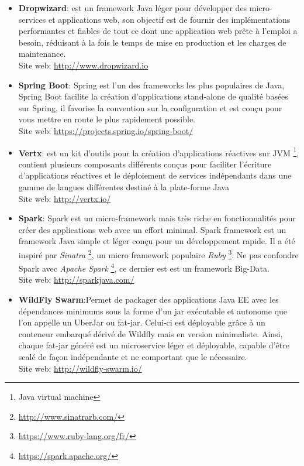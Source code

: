 \documentclass[12pt, a4paper, openany]{report}
\begin{document}
   \begin{itemize}
      \item \textbf{Dropwizard}: est un framework Java léger pour développer des micro-services et applications web, son objectif est de fournir des implémentations performantes et fiables de tout ce dont une application web prête à l'emploi a besoin, réduisant à la fois le temps de mise en production et les charges de maintenance.\\
      Site web: \url{http://www.dropwizard.io}
      
      \item \textbf{Spring Boot}: Spring est l'un des frameworks les plus populaires de Java, Spring Boot facilite la création d'applications stand-alone de qualité basées sur Spring, il favorise la convention sur la configuration et est conçu pour vous mettre en route le plus rapidement possible.\\
      Site web: \url{https://projects.spring.io/spring-boot/}
      
      \item \textbf{Vertx}: est un kit d'outils pour la création d'applications réactives sur JVM \footnote{Java virtual machine}, contient plusieurs composants différents conçus pour faciliter l'écriture d'applications réactives et le déploiement de services indépendants dans une gamme de langues différentes destiné à la plate-forme Java \\
      Site web: \url{http://vertx.io/}
      
      \item \textbf{Spark}: Spark est un micro-framework mais très riche en fonctionnalités pour créer des applications web avec un effort minimal. Spark framework est un framework Java simple et léger conçu pour un développement rapide. Il a été inspiré par \textit{Sinatra} \footnote{\url{http://www.sinatrarb.com/}}, un micro framework populaire \textit{Ruby} \footnote{\url{https://www.ruby-lang.org/fr/}}. Ne pas confondre Spark avec \textit{Apache Spark} \footnote{\url{https://spark.apache.org/}}, ce dernier est est un framework Big-Data. \\
      Site web: \url{http://sparkjava.com/}
      
      \item \textbf{WildFly Swarm}:Permet de packager des applications Java EE avec les dépendances minimums sous la forme d’un jar exécutable et autonome que l’on appelle un UberJar ou fat-jar. Celui-ci est déployable grâce à un conteneur embarqué dérivé de Wildfly mais en version minimaliste. Ainsi, chaque fat-jar généré est un microservice léger et déployable, capable d’être scalé de façon indépendante et ne comportant que le nécessaire. \\
      Site web: \url{http://wildfly-swarm.io/}
      

\end{itemize}
\end{document}
